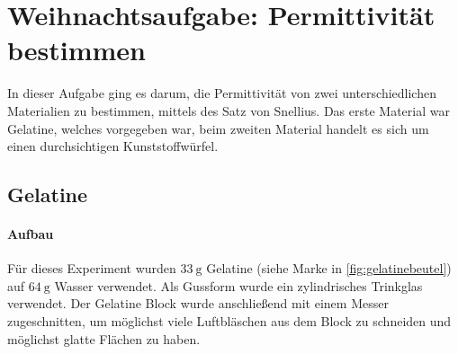 \documentclass[colorlinks = true, allcolors = black, ngerman, 11pt,
a4paper, twoside, titlepage]{article}
\numberwithin{figure}{section}
\renewcommand{\si}[2]{\SI{#1}{#2}}
\begin{document}
	
	\section{\huge Weihnachtsaufgabe: Permittivität bestimmen}
	
	In dieser Aufgabe ging es darum, die Permittivität von zwei
	unterschiedlichen Materialien zu bestimmen, mittels des Satz von Snellius.
	Das erste Material war Gelatine, welches vorgegeben war, beim zweiten
	Material handelt es sich um einen durchsichtigen Kunststoffwürfel.
	
	\subsection{Gelatine} \label{sec:gealtine}
	\paragraph{Aufbau}
	Für dieses Experiment wurden $\si{33}{\gram}$ Gelatine (siehe Marke
	in \cref{fig:gelatinebeutel}) auf $\si{64}{\gram}$ Wasser verwendet.
	Als Gussform wurde ein zylindrisches Trinkglas verwendet.
	Der Gelatine Block wurde anschließend mit einem Messer zugeschnitten,
	um möglichst viele Luftbläschen aus dem Block zu schneiden und
	möglichst glatte Flächen zu haben.
	
\end{document}
